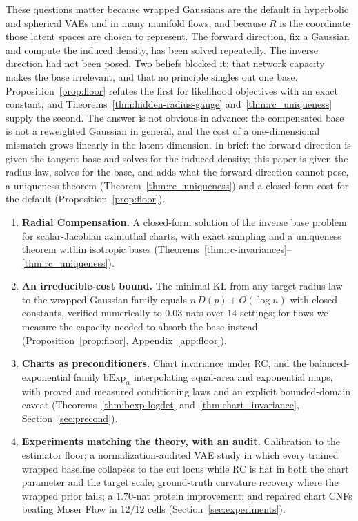 \documentclass{article}
\theoremstyle{definition}
\theoremstyle{remark}
\newcommand{\bExp}{\mathrm{bExp}}
\begin{document}
These questions matter because wrapped Gaussians are the default in hyperbolic and spherical VAEs and in many manifold flows, and because $R$ is the coordinate those latent spaces are chosen to represent. The forward direction, fix a Gaussian and compute the induced density, has been solved repeatedly. The inverse direction had not been posed. Two beliefs blocked it: that network capacity makes the base irrelevant, and that no principle singles out one base. Proposition~\ref{prop:floor} refutes the first for likelihood objectives with an exact constant, and Theorems~\ref{thm:hidden-radius-gauge} and~\ref{thm:rc_uniqueness} supply the second. The answer is not obvious in advance: the compensated base is not a reweighted Gaussian in general, and the cost of a one-dimensional mismatch grows linearly in the latent dimension.
 In brief: the forward direction is given the tangent base and solves for the induced density; this paper is given the radius law, solves for the base, and adds what the forward direction cannot pose, a uniqueness theorem (Theorem~\ref{thm:rc_uniqueness}) and a closed-form cost for the default (Proposition~\ref{prop:floor}).

\begin{tcolorbox}[colback=black!3,colframe=black!40,title=\textbf{Contributions},left=4pt,right=4pt,top=3pt,bottom=3pt]
\begin{enumerate}[leftmargin=1.2em,itemsep=1pt,topsep=1pt]
\item \textbf{Radial Compensation.} A closed-form solution of the inverse base problem for scalar-Jacobian azimuthal charts, with exact sampling and a uniqueness theorem within isotropic bases (Theorems~\ref{thm:rc-invariances}--\ref{thm:rc_uniqueness}).
\item \textbf{An irreducible-cost bound.} The minimal KL from any target radius law to the wrapped-Gaussian family equals $n\,D(p)+O(\log n)$ with closed constants, verified numerically to $0.03$ nats over $14$ settings; for flows we measure the capacity needed to absorb the base instead (Proposition~\ref{prop:floor}, Appendix~\ref{app:floor}).
\item \textbf{Charts as preconditioners.} Chart invariance under RC, and the balanced-exponential family $\bExp_\alpha$ interpolating equal-area and exponential maps, with proved and measured conditioning laws and an explicit bounded-domain caveat (Theorems~\ref{thm:bexp-logdet} and~\ref{thm:chart_invariance}, Section~\ref{sec:precond}).
\item \textbf{Experiments matching the theory, with an audit.} Calibration to the estimator floor; a normalization-audited VAE study in which every trained wrapped baseline collapses to the cut locus while RC is flat in both the chart parameter and the target scale; ground-truth curvature recovery where the wrapped prior fails; a $1.70$-nat protein improvement; and repaired chart CNFs beating Moser Flow in $12/12$ cells (Section~\ref{sec:experiments}).
\end{enumerate}
\end{tcolorbox}
\end{document}
